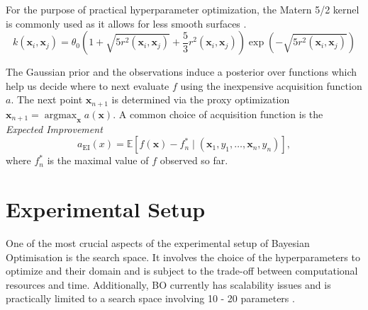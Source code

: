 \documentclass[bsc,frontabs,twoside,singlespacing,parskip,deptreport]{infthesis}     %
\let\Oldsection\section
\renewcommand{\section}{\FloatBarrier\Oldsection}
\begin{document}
For the purpose of practical hyperparameter optimization, the Matern 5/2 kernel is commonly used as it  allows for less smooth surfaces \cite{snoek_practical_nodate}.
\[k\left(\mathbf{x}_{i}, \mathbf{x}_{j}\right)=\theta_{0}\left(1+\sqrt{5 r^{2}\left(\mathbf{x}_{i}, \mathbf{x}_{j}\right)}+\frac{5}{3} r^{2}\left(\mathbf{x}_{i}, \mathbf{x}_{j}\right)\right) \exp \left(-\sqrt{5 r^{2}\left(\mathbf{x}_{i}, \mathbf{x}_{j}\right)}\right)\]

The Gaussian prior and the observations induce a posterior over functions which help us decide where to next evaluate \(f\) using the inexpensive acquisition function \(a\). The next point \(\mathbf{x}_{n+1}\) is determined via the proxy optimization  \(\mathbf{x}_{n+1}=\operatorname{argmax}_{\mathbf{x}} a(\mathbf{x})\).
A common choice of acquisition function is the \textit{Expected Improvement}
\[
a_{\mathrm{EI}}(x)=\mathbb{E}[f(\mathbf{x})-f_{n}^{*} \mid\left(\mathbf{x}_{1}, y_{1}, \ldots, \mathbf{x}_{n}, y_{n}\right)],
\] where \(f_{n}^{*}\) is the maximal value of \(f\) observed so far.
\section{Experimental Setup}
One of the most crucial aspects of the experimental setup of Bayesian Optimisation is the search space. It involves the choice of the hyperparameters to optimize and their domain and is subject to the trade-off between computational resources and time. Additionally, BO currently has scalability issues and is practically limited to a search space involving 10 - 20 parameters \cite{moriconi_high-dimensional_2020}.
\end{document}
